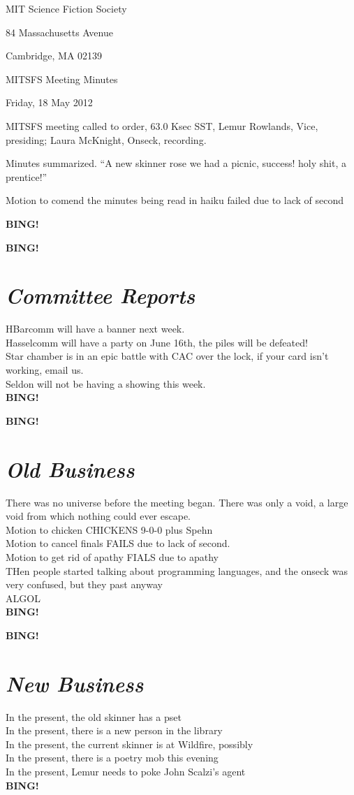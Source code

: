\documentclass[10pt]{article}
\newcommand{\bing}{{\bf BING!} }
\newcommand{\goto}[1]{\bing \vskip 12pt \section*{{\em{#1}}}}
\newcommand{\ps}{ plus Spehn\xspace}
\newcommand{\onseck}{Laura McKnight, Onseck}
\newcommand{\meetingdate}{Friday, 18 May 2012}
\begin{document}
\begin{center}

MIT Science Fiction Society

84 Massachusetts Avenue

Cambridge, MA 02139

\vspace{12pt}

MITSFS Meeting Minutes

\meetingdate

\end{center}

\vspace{18pt}

\setlength{\parskip}{6pt}

\noindent
MITSFS meeting called to order, 63.0 Ksec SST,
Lemur Rowlands, Vice, presiding; \onseck, recording.

Minutes summarized.
``A new skinner rose
we had a picnic, success!
holy shit, a prentice!''

Motion to comend the minutes being read in haiku failed due to lack of second

\bing

\goto{Committee Reports}
HBarcomm will have a banner next week.\\
Hasselcomm will have a party on June 16th, the piles will be defeated!\\
Star chamber is in an epic battle with CAC over the lock, if your card isn't working, email us.\\
Seldon will not be having a showing this week.\\
\bing

\goto{Old Business}
There was no universe before the meeting began. There was only a void, a large void from which nothing could ever escape.\\
Motion to chicken CHICKENS 9-0-0\ps \\
Motion to cancel finals FAILS due to lack of second.\\
Motion to get rid of apathy FIALS due to apathy\\
THen people started talking about programming languages, and the onseck was very confused, but they past anyway\\
ALGOL\\
\bing

\goto{New Business}
In the present, the old skinner has a pset\\
In the present, there is a new person in the library\\
In the present, the current skinner is at Wildfire, possibly\\
In the present, there is a poetry mob this evening\\
In the present, Lemur needs to poke John Scalzi's agent\\
\bing
\end{document}
